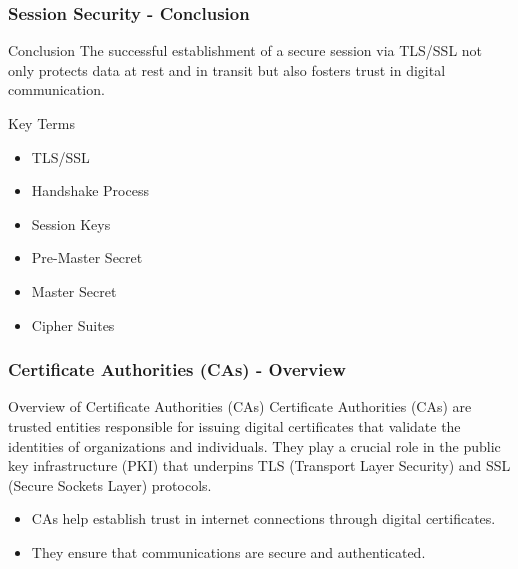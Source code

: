 \documentclass{beamer}
\begin{document}
\begin{frame}[fragile]
    \frametitle{Session Security - Conclusion}
    \begin{block}{Conclusion}
        The successful establishment of a secure session via TLS/SSL not only protects data at rest and in transit but also fosters trust in digital communication.
    \end{block}
    \begin{block}{Key Terms}
        \begin{itemize}
            \item TLS/SSL
            \item Handshake Process
            \item Session Keys
            \item Pre-Master Secret
            \item Master Secret
            \item Cipher Suites
        \end{itemize}
    \end{block}
\end{frame}

\begin{frame}[fragile]
    \frametitle{Certificate Authorities (CAs) - Overview}
    \begin{block}{Overview of Certificate Authorities (CAs)}
        Certificate Authorities (CAs) are trusted entities responsible for issuing digital certificates that validate the identities of organizations and individuals. They play a crucial role in the public key infrastructure (PKI) that underpins TLS (Transport Layer Security) and SSL (Secure Sockets Layer) protocols.
    \end{block}
    \begin{itemize}
        \item CAs help establish trust in internet connections through digital certificates.
        \item They ensure that communications are secure and authenticated.
    \end{itemize}
\end{frame}
\end{document}
